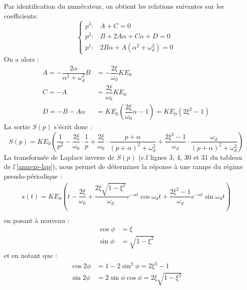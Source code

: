 Par identification du numérateur,
on obtient les relations suivantes sur les coefficients:
$$
\begin{cases}
    p^3:\,\,\,\,\,A+C=0\\
    p^2:\,\,\,\,\,B+2A\alpha+C\alpha+D=0\\
    p^1:\,\,\,\,\,2B\alpha+A(\alpha^2+\omega_d^2)=0
\end{cases}
$$
On a alors :
\begin{align*}
    A=-\dfrac{2\alpha}{\alpha^2+\omega_d^2}B&=-\dfrac{2\xi}{\omega_0}KE_0\\
    C=-A&=\dfrac{2\xi}{\omega_0}KE_0\\
    D=-B-A\alpha&=KE_0\left(\dfrac{2\xi}{\omega_0}\alpha-1\right)=KE_0(2\xi^2-1)
\end{align*}
La sortie $S(p)$ s'écrit donc :
$$
S(p)=KE_0\left(\dfrac{1}{p^2}-\dfrac{2\xi}{\omega_0}\cdot\dfrac{1}{p}+\dfrac{2\xi}{\omega_0}\cdot\dfrac{p+\alpha}{(p+\alpha)^2+\omega_d^2} + \dfrac{2\xi^2-1}{\omega_d}\cdot\dfrac{\omega_d}{(p+\alpha)^2+\omega_d^2}\right)
$$
La transformée de Laplace inverse de $S(p)$ (c.f lignes 3, 4, 30 et 31 du tableau de l'\cref{annexe-lap}),         
nous permet de déterminer la réponse à une rampe du régime pseudo-périodique :
\begin{align*}
    s(t)=KE_0\left(t-\dfrac{2\xi}{\omega_0}+\dfrac{2\xi\sqrt{1-\xi^2}}{\omega_d}e^{-\alpha t}\cos{\omega_d t}+\dfrac{2\xi^2-1}{\omega_d}e^{-\alpha t}\sin{\omega_d t}\right)\\
\end{align*}
en posant à nouveau : 
\begin{align*}
    \cos{\phi}&=\xi\\
    \sin{\phi}&=\sqrt{1-\xi^2}
\end{align*}
et en notant que :
\begin{align*}
    \cos{2\phi}&=1-2\sin^2\phi=2\xi^2-1\\
    \sin{2\phi}&=2\sin\phi\cos\phi=2\xi\sqrt{1-\xi^2}
\end{align*}

